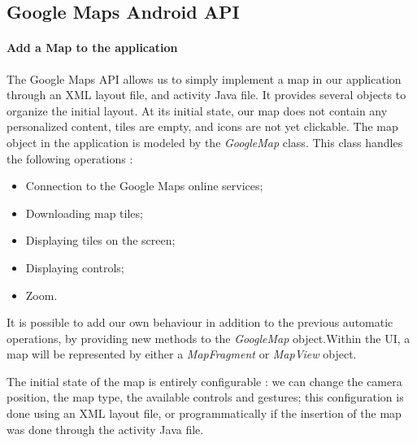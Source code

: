 \subsection{Google Maps Android API}
\paragraph{Add a Map to the application}The Google Maps API allows us to simply implement a map in our application through an XML layout file, and activity Java file. It provides several objects to organize the initial layout. At its initial state, our map does not contain any personalized content, tiles are empty, and icons are not yet clickable.
The map object in the application is modeled by the \textit{GoogleMap} class. This class handles the following operations : 
\begin{itemize}
	\item Connection to the Google Maps online services;
	\item Downloading map tiles;
	\item Displaying tiles on the screen;
	\item Displaying controls;
	\item Zoom.
\end{itemize}
It is possible to add our own behaviour in addition to the previous automatic operations, by providing new methods to the \textit{GoogleMap} object.Within the UI, a map will be represented by either a \textit{MapFragment} or \textit{MapView} object.

The initial state of the map is entirely configurable : we can change the camera position, the map type, the available controls and gestures; this configuration is done using an XML layout file, or programmatically if the insertion of the map was done through the activity Java file.

